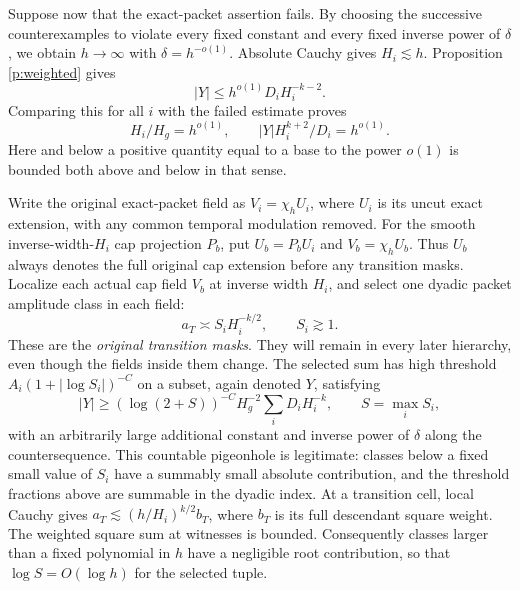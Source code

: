 Suppose now that the exact-packet assertion fails. By choosing the
successive counterexamples to violate every fixed constant and every
fixed inverse power of $\delta$, we obtain $h\to\infty$ with
$\delta=h^{-o(1)}$. Absolute Cauchy gives $H_i\lesssim h$. Proposition
\ref{p:weighted} gives
\[
 |Y|\le h^{o(1)}D_iH_i^{-k-2}.
\]
Comparing this for all $i$ with the failed estimate proves
\begin{equation}\label{f:hbalance}
 H_i/H_g=h^{o(1)},\qquad |Y|H_i^{k+2}/D_i=h^{o(1)}.
\end{equation}
Here and below a positive quantity equal to a base to the power $o(1)$
is bounded both above and below in that sense.

Write the original exact-packet field as $V_i=\chi_h U_i$, where
$U_i$ is its uncut exact extension, with any common temporal
modulation removed. For the smooth inverse-width-$H_i$ cap projection
$P_b$, put $U_b=P_bU_i$ and $V_b=\chi_h U_b$. Thus $U_b$ always
denotes the full original cap extension before any transition masks.
Localize each actual cap field $V_b$ at inverse width $H_i$, and select
one dyadic packet amplitude class in each field:
\begin{equation}\label{f:original-amplitudes}
 a_T\asymp S_iH_i^{-k/2},\qquad S_i\gtrsim1.
\end{equation}
These are the \emph{original transition masks}. They will remain in
every later hierarchy, even though the fields inside them change.
The selected sum has high threshold
$A_i(1+|\log S_i|)^{-C}$ on a subset, again denoted $Y$, satisfying
\begin{equation}\label{f:selected-counter}
 |Y|\ge (\log(2+S))^{-C}H_g^{-2}\sum_iD_iH_i^{-k},
 \qquad S=\max_iS_i,
\end{equation}
with an arbitrarily large additional constant and inverse power of
$\delta$ along the countersequence. This countable pigeonhole is
legitimate: classes below a fixed small value of $S_i$ have a summably
small absolute contribution, and the threshold fractions above are
summable in the dyadic index. At a transition cell, local Cauchy gives
$a_T\lesssim(h/H_i)^{k/2}b_T$, where $b_T$ is its full descendant square
weight. The weighted square sum at witnesses is bounded. Consequently
classes larger than a fixed polynomial in $h$ have a negligible root
contribution, so that $\log S=O(\log h)$ for the selected tuple.

